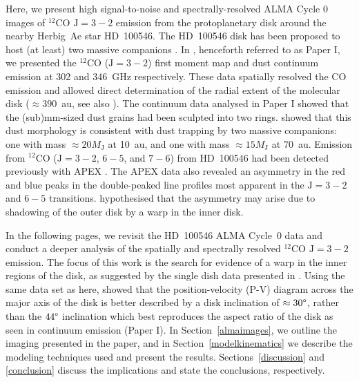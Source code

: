 \documentclass[onecolumn]{aastex6}
\begin{document}
Here, we present high signal-to-noise and spectrally-resolved ALMA Cycle 0
images of $^{12}$CO $\mathrm{J}=3-2$ emission from the protoplanetary disk
around the nearby Herbig~Ae star HD~100546. The HD~100546 disk has been proposed
to host (at least) two massive companions \citep[see,
e.g.,][]{acke06,quanz13,walsh14}. In \citet{walsh14}, henceforth referred to as
Paper I, we presented the $^{12}$CO ($\mathrm{J}=3-2$) first moment map and dust
continuum emission at 302 and 346~GHz respectively. These data spatially
resolved the CO emission and allowed direct determination of the radial extent
of the molecular disk ($\approx 390$~au, see also \citealt{pineda14}). The
continuum data analysed in Paper I showed that the (sub)mm-sized dust grains had
been sculpted into two rings. \citet{pinilla15} showed that this dust morphology
is consistent with dust trapping by two massive companions: one with mass
$\approx 20 M_\mathrm{J}$ at 10~au, and one with mass $\approx 15 M_\mathrm{J}$
at 70~au. Emission from $^{12}$CO ($\mathrm{J}=3-2$, $6-5$, and $7-6$) from
HD~100546 had been detected previously with APEX \citep{panic10}. The APEX data
also revealed an asymmetry in the red and blue peaks in the double-peaked line
profiles most apparent in the $\mathrm{J}=3-2$ and $6-5$ transitions.
\citet{panic10} hypothesised that the asymmetry may arise due to shadowing of
the outer disk by a warp in the inner disk.

In the following pages, we revisit the HD~100546 ALMA Cycle~0 data and  conduct
a deeper analysis of the spatially and spectrally resolved $^{12}$CO
$\mathrm{J}=3-2$ emission. The focus of this work is the search for evidence of
a warp in the inner regions of the disk, as suggested by the single dish data
presented in \citet{panic10}. Using the same data set as here, \citet{pineda14}
showed that the position-velocity (P-V) diagram across the major axis of the
disk is better described by a disk inclination of $\approx 30\degree$, rather
than the $44\degree$ inclination which best reproduces the aspect ratio of the
disk as seen in continuum emission (Paper I). In Section~\ref{almaimages}, we
outline the imaging presented in the paper, and in Section~\ref{modelkinematics}
we describe the modeling techniques used and present the results.
Sections~\ref{discussion} and \ref{conclusion} discuss the implications and
state the conclusions, respectively.

\end{document}
